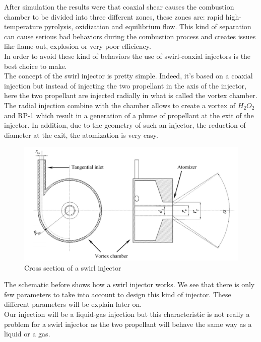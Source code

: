 After simulation the results were that coaxial shear causes the combustion chamber to be divided into three different zones, these zones are: rapid high-temperature pyrolysis, oxidization and equilibrium flow. This kind of separation can cause serious bad behaviors during the combustion process and creates issues like flame-out, explosion or very poor efficiency. \\
In order to avoid these kind of behaviors the use of swirl-coaxial injectors is the best choice to make. \\

The concept of the swirl injector is pretty simple. Indeed, it's based on a coaxial injection but instead of injecting the two propellant in the axis of the injector, here the two propellant are injected radially in what is called the vortex chamber. 
The radial injection combine with the chamber allows to create a vortex of $H_2O_2$ and RP-1 which result in a generation of a plume of propellant at the exit of the injector. In addition, due to the geometry of such an injector, the reduction of diameter at the exit, the atomization is very easy.

\begin{figure}[H]
    \centering
    \includegraphics[width=\linewidth]{swirl}
    \caption{Cross section of a swirl injector}
\end{figure}

The schematic before shows how a swirl injector works. We see that there is only few parameters to take into account to design this kind of injector. These different parameters will be explain later on. \\

Our injection will be a liquid-gas injection but this characteristic is not really a problem for a swirl injector as the two propellant will behave the same way as a liquid or a gas.\\

